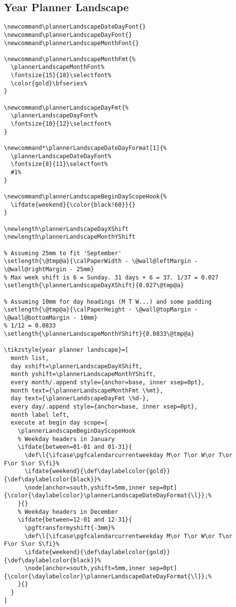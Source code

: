 \documentclass[11pt,oneside]{memoir-article}
\begin{document}
\subsection{Year Planner Landscape}
\label{sec:org5b67e8c}

\begin{verbatim}
\newcommand\plannerLandscapeDateDayFont{}
\newcommand\plannerLandscapeDayFont{}
\newcommand\plannerLandscapeMonthFont{}

\newcommand\plannerLandscapeMonthFmt{%
  \plannerLandscapeMonthFont%
  \fontsize{15}{18}\selectfont%
  \color{gold}\bfseries%
}

\newcommand\plannerLandscapeDayFmt{%
  \plannerLandscapeDayFont%
  \fontsize{10}{12}\selectfont%
}

\newcommand*\plannerLandscapeDateDayFormat[1]{%
  \plannerLandscapeDateDayFont%
  \fontsize{8}{11}\selectfont%
  #1%
}

\newcommand\plannerLandscapeBeginDayScopeHook{%
  \ifdate{weekend}{\color{black!60}}{}
}

\newlength\plannerLandscapeDayXShift
\newlength\plannerLandscapeMonthYShift

% Assuming 25mm to fit 'September'
\setlength{\@tmp@a}{\calPaperWidth - \@wall@leftMargin - \@wall@rightMargin - 25mm}
% Max week shift is 6 = Sunday. 31 days + 6 = 37. 1/37 = 0.027
\setlength{\plannerLandscapeDayXShift}{0.027\@tmp@a}

% Assuming 10mm for day headings (M T W...) and some padding
\setlength{\@tmp@a}{\calPaperHeight - \@wall@topMargin - \@wall@bottomMargin - 10mm}
% 1/12 = 0.0833
\setlength{\plannerLandscapeMonthYShift}{0.0833\@tmp@a}

\tikzstyle{year planner landscape}=[
  month list,
  day xshift=\plannerLandscapeDayXShift,
  month yshift=\plannerLandscapeMonthYShift,
  every month/.append style={anchor=base, inner xsep=0pt},
  month text={\plannerLandscapeMonthFmt \%mt},
  day text={\plannerLandscapeDayFmt \%d-},
  every day/.append style={anchor=base, inner xsep=0pt},
  month label left,
  execute at begin day scope={
    \plannerLandscapeBeginDayScopeHook
    % Weekday headers in January
    \ifdate{between=01-01 and 01-31}{
      \def\l{\ifcase\pgfcalendarcurrentweekday M\or T\or W\or T\or F\or S\or S\fi}%
      \ifdate{weekend}{\def\daylabelcolor{gold}}{\def\daylabelcolor{black}}%
      \node[anchor=south,yshift=5mm,inner sep=0pt]{\color{\daylabelcolor}\plannerLandscapeDateDayFormat{\l}};%
    }{}
    % Weekday headers in December
    \ifdate{between=12-01 and 12-31}{
      \pgftransformyshift{-3mm}%
      \def\l{\ifcase\pgfcalendarcurrentweekday M\or T\or W\or T\or F\or S\or S\fi}%
      \ifdate{weekend}{\def\daylabelcolor{gold}}{\def\daylabelcolor{black}}%
      \node[anchor=south,yshift=5mm,inner sep=0pt]{\color{\daylabelcolor}\plannerLandscapeDateDayFormat{\l}};%
    }{}
  }
]
\end{verbatim}
\end{document}
